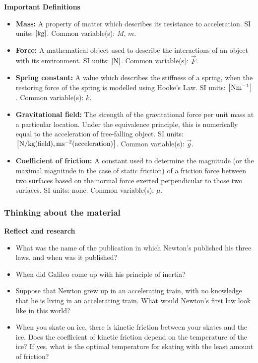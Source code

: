 \begin{framed}
\textbf{Important Definitions}\\
\begin{itemize}
\item \textbf{Mass:} A property of matter which describes its resistance to acceleration. SI units: ${\rm \left[{kg}\right]}$. Common variable(s): $M$, $m$.
\item \textbf{Force:} A mathematical object used to describe the interactions of an object with its environment. SI units: ${\rm \left[{N}\right]}$. Common variable(s): $\vec F$.
\item \textbf{Spring constant:} A value which describes the stiffness of a spring, when the restoring force of the spring is modelled using Hooke's Law. SI units: ${\rm \left[{Nm^{ -1}}\right]}$. Common variable(s): $k$.
\item \textbf{Gravitational field:} The strength of the gravitational force per unit mass at a particular location. Under the equivalence principle, this is numerically equal to the acceleration of free-falling object. SI units: ${\rm \left[N/kg (field), ms^{ -2} (acceleration)\right]}$. Common variable(s): $\vec g$.
\item \textbf{Coefficient of friction:} A constant used to determine the magnitude (or the maximal magnitude in the case of static friction) of a friction force between two surfaces based on the normal force exerted perpendicular to those two surfaces. SI units: none. Common variable(s): $\mu$.
\end{itemize}
\end{framed}

\subsubsection{Thinking about the material}

\begin{framed}
\textbf{Reflect and research}\\
\begin{itemize}
\item What was the name of the publication in which Newton's published his three laws, and when was it published?
\item When did Galileo come up with his principle of inertia?
\item Suppose that Newton grew up in an accelerating train, with no knowledge that he is living in an accelerating train. What would Newton's first law look like in this world?
\item When you skate on ice, there is kinetic friction between your skates and the ice. Does the coefficient of kinetic friction depend on the temperature of the ice? If yes, what is the optimal temperature for skating with the least amount of friction?
\end{itemize}
\end{framed}

